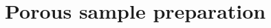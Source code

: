 \documentclass[12pt,t]{beamer}
\begin{document}


\section{Porous sample preparation}
\end{document}
